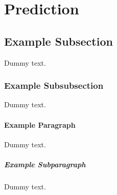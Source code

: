 \section{Prediction}




\subsection{Example Subsection}

Dummy text.

\subsubsection{Example Subsubsection}

Dummy text.

\paragraph{Example Paragraph}

Dummy text.

\subparagraph{Example Subparagraph}

Dummy text.
